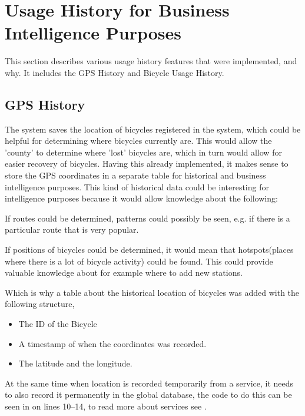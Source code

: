 \section{Usage History for Business Intelligence Purposes}
This section describes various usage history features that were implemented, and why. It includes the GPS History and Bicycle Usage History.

\subsection{GPS History}
The system saves the location of bicycles registered in the system, which could be helpful for determining where bicycles currently are. 
This would allow the 'county' to determine where 'lost' bicycles are, which in turn would allow for easier recovery of bicycles.
Having this already implemented, it makes sense to store the GPS coordinates in a separate table for historical and business intelligence purposes.
This kind of historical data could be interesting for intelligence purposes because it would allow knowledge about the following:

\begin{description}[style=nextline]
\item[Which routes are used?] If routes could be determined, patterns could possibly be seen, e.g. if there is a particular route that is very popular.
\item[Are there hotspots for bicycles?] If positions of bicycles could be determined, it would mean that hotspots(places where there is a lot of bicycle activity) could be found. 
This could provide valuable knowledge about for example where to add new stations.
\end{description}

Which is why a table about the historical location of bicycles was added with the following structure,

\begin{itemize}
\item The ID of the Bicycle
\item A timestamp of when the coordinates was recorded.
\item The latitude and the longitude.
\end{itemize}


At the same time when location is recorded temporarily from a service, it needs to also record it permanently in the global database, the code to do this can be seen in  on lines 10--14, to read more about services see .

